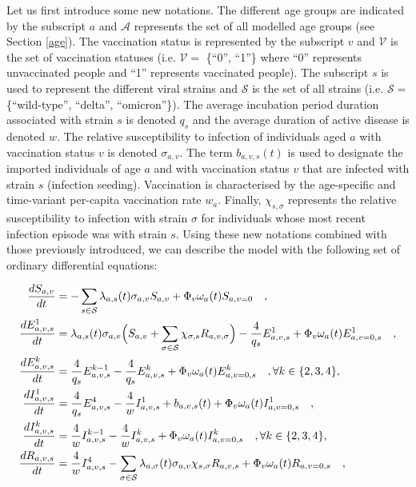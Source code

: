 Let us first introduce some new notations. The different age groups are indicated by the subscript $a$ and $\mathcal{A}$ represents
the set of all modelled age groups (see Section \ref{age}). The vaccination status is represented by the subscript $v$ and $\mathcal{V}$ is the set of 
vaccination statuses (i.e. $\mathcal{V}=$ \{``0'', ``1''\} where ``0'' represents unvaccinated people and ``1'' represents vaccinated people). The subscript $s$ is used to represent the different viral strains and $\mathcal{S}$ is the set 
of all strains (i.e. $\mathcal{S}=$ \{``wild-type'', ``delta'', ``omicron''\}). The average incubation period duration associated with strain $s$ is denoted $q_s$ and
the average duration of active disease is denoted $w$. The relative susceptibility to infection of individuals aged $a$ with 
vaccination status $v$ is denoted $\sigma_{a,v}$. The term $b_{a,v,s}(t)$ is used to designate the imported individuals of age $a$ and 
with vaccination status $v$ that are infected with strain $s$ (infection seeding). Vaccination is characterised by the age-specific
and time-variant per-capita vaccination rate $w_a$. Finally, $\chi_{s,\sigma}$ represents the relative susceptibility to infection
with strain $\sigma$ for individuals whose most recent infection episode was with strain $s$. Using these new notations combined 
with those previously introduced, we can describe the model with the following set of ordinary differential equations:

\begin{equation}
    \label{ode}
    \begin{split}
\frac{dS_{a,v}}{dt} & = -\sum_{s \in \mathcal{S}} \lambda_{a,s}(t)\sigma_{a,v} S_{a,v} + \Phi_v\omega_a(t)S_{a,v=0}  \quad , \\
\frac{dE_{a,v,s}^{1}}{dt} & =\lambda_{a,s}(t)\sigma_{a,v} \Bigl(S_{a,v}  +  \sum_{\sigma \in \mathcal{S}} \chi_{\sigma, s} R_{a,v,\sigma} \Bigr) - \frac{4}{q_{s}}E_{a,v,s}^{1} + \Phi_v\omega_a(t)E_{a,v=0,s}^1 \quad , \\
\frac{dE_{a,v,s}^{k}}{dt} & = \frac{4}{q_{s}}E_{a,v,s}^{k-1} - \frac{4}{q_{s}}E_{a,v,s}^{k} + \Phi_v\omega_a(t)E_{a,v=0,s}^k \quad,  \forall k \in \{2,3,4\} , \\
\frac{dI_{a,v,s}^{1}}{dt} & = \frac{4}{q_{s}}E_{a,v,s}^{4} - \frac{4}{w}I_{a,v,s}^{1} + b_{a,v,s}(t) + \Phi_v\omega_a(t)I_{a,v=0,s}^1 \quad , \\
\frac{dI_{a,v,s}^{k}}{dt} & = \frac{4}{w}I_{a,v,s}^{k-1} - \frac{4}{w}I_{a,v,s}^{k} + \Phi_v\omega_a(t)I_{a,v=0,s}^k \quad, \forall k \in \{2,3,4\} , \\
\frac{dR_{a,v,s}}{dt} & = \frac{4}{w}I_{a,v,s}^{4} - \sum _{\sigma \in \mathcal{S}} \lambda_{a,\sigma}(t)\sigma_{a,v} \chi_{s, \sigma} R_{a,v, s} + \Phi_v\omega_a(t)R_{a,v=0,s} \quad, 
    \end{split}
\end{equation}

